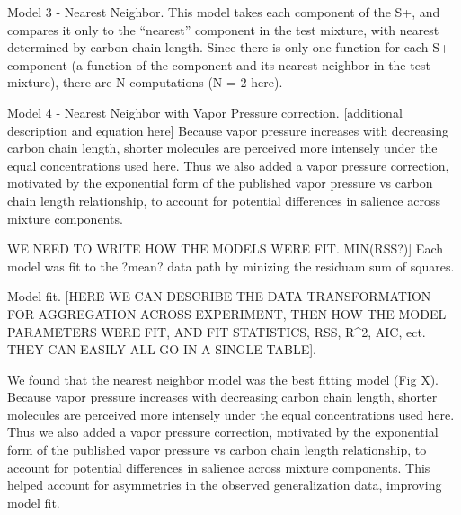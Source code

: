 Model 3 - Nearest Neighbor.
This model takes each component of the S+, and compares it only to the “nearest” component in the test mixture, with nearest determined by carbon chain length.  Since there is only one function for each S+ component (a function of the component and its nearest neighbor in the test mixture), there are N computations (N = 2 here).  

Model 4 - Nearest Neighbor with Vapor Pressure correction. 
[additional description and equation here] 
Because vapor pressure increases with decreasing carbon chain length, shorter molecules are perceived more intensely under the equal concentrations used here.  Thus we also added a vapor pressure correction, motivated by the exponential form of the published vapor pressure vs carbon chain length relationship, to account for potential differences in salience across mixture components. 

WE NEED TO WRITE HOW THE MODELS WERE FIT. MIN(RSS?)] Each model was fit to the ?mean? data path by minizing the residuam sum of squares.

Model fit. [HERE WE CAN DESCRIBE THE DATA TRANSFORMATION FOR AGGREGATION ACROSS EXPERIMENT, THEN HOW THE MODEL PARAMETERS WERE FIT, AND FIT STATISTICS, RSS, R^2, AIC, ect. THEY CAN EASILY ALL GO IN A SINGLE TABLE]. 

We found that the nearest neighbor model was the best fitting model (Fig X).  Because vapor pressure increases with decreasing carbon chain length, shorter molecules are perceived more intensely under the equal concentrations used here.  Thus we also added a vapor pressure correction, motivated by the exponential form of the published vapor pressure vs carbon chain length relationship, to account for potential differences in salience across mixture components.  This helped account for asymmetries in the observed generalization data, improving model fit.  